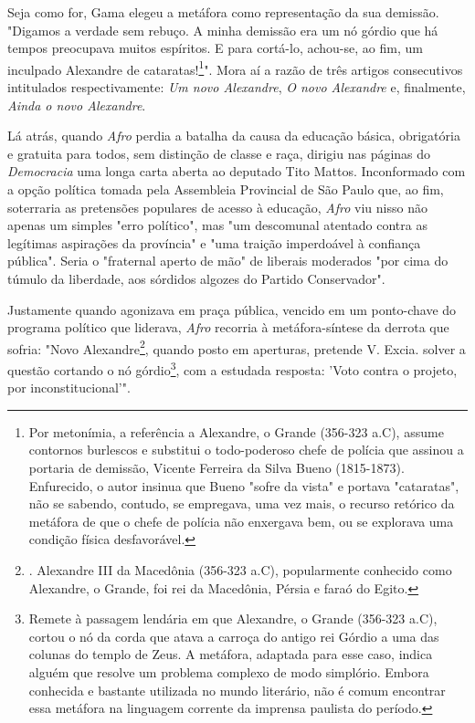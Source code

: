 Seja como for, Gama elegeu a metáfora como representação da sua
demissão. "Digamos a verdade sem rebuço. A minha demissão era um nó
górdio que há tempos preocupava muitos espíritos. E para cortá-lo,
achou-se, ao fim, um inculpado Alexandre de cataratas!\footnote{Por
  metonímia, a referência a Alexandre, o Grande (356-323 a.C), assume
  contornos burlescos e substitui o todo-poderoso chefe de polícia que
  assinou a portaria de demissão, Vicente Ferreira da Silva Bueno
  (1815-1873). Enfurecido, o autor insinua que Bueno "sofre da vista" e
  portava "cataratas", não se sabendo, contudo, se empregava, uma vez
  mais, o recurso retórico da metáfora de que o chefe de polícia não
  enxergava bem, ou se explorava uma condição física desfavorável.}".
Mora aí a razão de três artigos consecutivos intitulados
respectivamente: \emph{Um novo Alexandre}, \emph{O novo Alexandre} e,
finalmente, \emph{Ainda o novo Alexandre}.

Lá atrás, quando \emph{Afro} perdia a batalha da causa da educação
básica, obrigatória e gratuita para todos, sem distinção de classe e
raça, dirigiu nas páginas do \emph{Democracia} uma longa carta aberta ao
deputado Tito Mattos. Inconformado com a opção política tomada pela
Assembleia Provincial de São Paulo que, ao fim, soterraria as pretensões
populares de acesso à educação, \emph{Afro} viu nisso não apenas um
simples "erro político", mas "um descomunal atentado contra as legítimas
aspirações da província" e "uma traição imperdoável à confiança
pública". Seria o "fraternal aperto de mão" de liberais moderados "por
cima do túmulo da liberdade, aos sórdidos algozes do Partido
Conservador".

Justamente quando agonizava em praça pública, vencido em um ponto-chave
do programa político que liderava, \emph{Afro} recorria à
metáfora-síntese da derrota que sofria: "Novo Alexandre\footnote{.
  Alexandre III da Macedônia (356-323 a.C), popularmente conhecido como
  Alexandre, o Grande, foi rei da Macedônia, Pérsia e faraó do Egito.},
quando posto em aperturas, pretende V. Excia. solver a questão cortando
o nó górdio\footnote{Remete à passagem lendária em que Alexandre, o
  Grande (356-323 a.C), cortou o nó da corda que atava a carroça do
  antigo rei Górdio a uma das colunas do templo de Zeus. A metáfora,
  adaptada para esse caso, indica alguém que resolve um problema
  complexo de modo simplório. Embora conhecida e bastante utilizada no
  mundo literário, não é comum encontrar essa metáfora na linguagem
  corrente da imprensa paulista do período.}, com a estudada resposta:
'Voto contra o projeto, por inconstitucional'".


